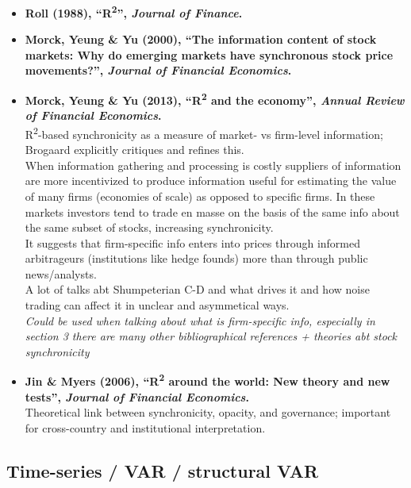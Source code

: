 \documentclass[11pt,a4paper]{article}
\begin{document}
\begin{itemize}
  \item \textbf{Roll (1988), ``R\textsuperscript{2}'', \emph{Journal of Finance}.}
  \item \textbf{Morck, Yeung \& Yu (2000), ``The information content of stock markets: Why do emerging markets have synchronous stock price movements?'', \emph{Journal of Financial Economics}.}
  \item \textbf{Morck, Yeung \& Yu (2013), ``R\textsuperscript{2} and the economy'', \emph{Annual Review of Financial Economics}.}\\
  R\textsuperscript{2}-based synchronicity as a measure of market- vs firm-level information; Brogaard explicitly critiques and refines this.\\
  When information gathering and processing is costly suppliers of information are more incentivized to produce information useful for estimating the value of many firms (economies of scale) as opposed to specific firms. In these markets investors tend to trade en masse on the basis of the same info about the same subset of stocks, increasing synchronicity.\\
  It suggests that firm-specific info enters into prices through informed arbitrageurs (institutions like hedge founds) more than through public news/analysts.\\
  A lot of talks abt Shumpeterian C-D and what drives it and how noise trading can affect it in unclear and asymmetical ways.\\
  \textit{Could be used when talking about what is firm-specific info, especially in section 3 there are  many other bibliographical references + theories abt stock synchronicity}

  \item \textbf{Jin \& Myers (2006), ``R\textsuperscript{2} around the world: New theory and new tests'', \emph{Journal of Financial Economics}.}\\
  Theoretical link between synchronicity, opacity, and governance; important for cross-country and institutional interpretation.
\end{itemize}

\subsection{Time-series / VAR / structural VAR}
\end{document}
